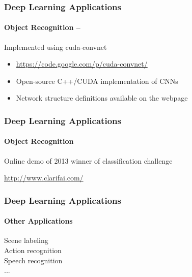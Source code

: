 \documentclass[xetex,professionalfont]{beamer}
\begin{document}

\begin{frame}
\frametitle{Deep Learning Applications}
\framesubtitle{Object Recognition -- \cite{krizhevsky2012}}

Implemented using cuda-convnet
\begin{itemize}
    \item \url{https://code.google.com/p/cuda-convnet/}
    \item Open-source C++/CUDA implementation of CNNs
    \item Network structure definitions available on the webpage
\end{itemize}

\end{frame}


\begin{frame}
\frametitle{Deep Learning Applications}
\framesubtitle{Object Recognition}

\begin{center}
    Online demo of 2013 winner of classification challenge

    \bigskip
    \url{http://www.clarifai.com/}
\end{center}

\end{frame}


\begin{frame}
\frametitle{Deep Learning Applications}
\framesubtitle{Other Applications}

Scene labeling\\\medskip
Action recognition\\\medskip
Speech recognition\\\medskip
...


\end{frame}

\end{document}
